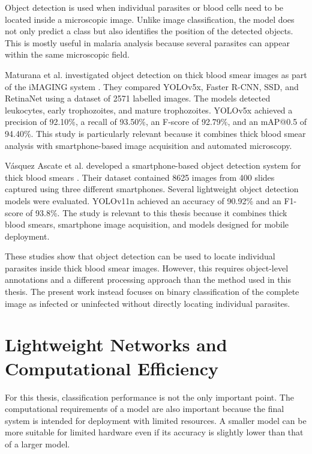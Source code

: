 Object detection is used when individual parasites or blood cells need to be located inside a microscopic image. Unlike image classification, the model does not only predict a class but also identifies the position of the detected objects. This is mostly useful in malaria analysis because several parasites can appear within the same microscopic field.

Maturana et al. investigated object detection on thick blood smear images as part of the iMAGING system \cite{Maturana2023}. They compared YOLOv5x, Faster R-CNN, SSD, and RetinaNet using a dataset of 2571 labelled images. The models detected leukocytes, early trophozoites, and mature trophozoites. YOLOv5x achieved a precision of 92.10\%, a recall of 93.50\%, an F-score of 92.79\%, and an mAP@0.5 of 94.40\%. This study is particularly relevant because it combines thick blood smear analysis with smartphone-based image acquisition and automated microscopy.

Vásquez Ascate et al. developed a smartphone-based object detection system for thick blood smears \cite{VasquezAscate2026}. Their dataset contained 8625 images from 400 slides captured using three different smartphones. Several lightweight object detection models were evaluated. YOLOv11n achieved an accuracy of 90.92\% and an F1-score of 93.8\%. The study is relevant to this thesis because it combines thick blood smears, smartphone image acquisition, and models designed for mobile deployment.

These studies show that object detection can be used to locate individual parasites inside thick blood smear images. However, this requires object-level annotations and a different processing approach than the method used in this thesis. The present work instead focuses on binary classification of the complete image as infected or uninfected without directly locating individual parasites.

\section{Lightweight Networks and Computational Efficiency}
\label{sec:lightweight_networks}

For this thesis, classification performance is not the only important point. The computational requirements of a model are also important because the final system is intended for deployment with limited resources. A smaller model can be more suitable for limited hardware even if its accuracy is slightly lower than that of a larger model.

